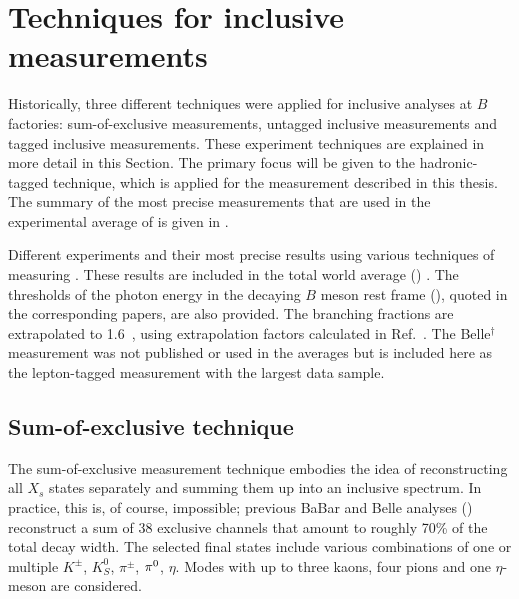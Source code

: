 \section{Techniques for inclusive \safeBtoXsgamma measurements}\label{sec:btosgamma_techniques}
Historically, three different techniques were applied for inclusive \BtoXsgamma analyses at $B$ factories: 
sum-of-exclusive measurements,
untagged inclusive measurements and
tagged inclusive measurements.
These experiment techniques are explained in more detail in this Section.
The primary focus will be given to the hadronic-tagged technique, which is applied for the measurement described in this thesis.
The summary of the most precise measurements that are used in the experimental average of  is given in .

{\renewcommand{\arraystretch}{1.2}
 \begin{table}[!htbp]
     \centering
     \caption{\label{tab:btosgamma_inclusive_summary}
     Different experiments and their most precise results using various techniques of measuring \BtoXsgamma.
     These results are included in the total \BtoXsgamma world average () \cite{Amhis:2022mac,Workman:2022ynf}.
     The thresholds of the photon energy in the decaying $B$ meson rest frame (\EB), quoted in the corresponding papers, are also provided.
     The branching fractions are extrapolated to 1.6~\gev, using extrapolation factors calculated in Ref.~\cite{Buchmuller:2005zv}.
     The Belle$^{\dagger}$ measurement was not published or used in the averages but is included here as the lepton-tagged measurement with the largest data sample.
     }
     
 \end{table}
 }

\subsection{Sum-of-exclusive technique}\label{sec:sum_of_exclusive}

The sum-of-exclusive measurement technique embodies the idea of reconstructing all $X_s$ states separately and summing them up into an inclusive spectrum.
In practice, this is, of course, impossible; previous BaBar and Belle analyses (\cite{BaBar:2012eja,Belle:2014nmp}) reconstruct a sum of 38 exclusive channels that amount to roughly 70\% of the total \BtoXsgamma decay width.
The selected final states include various combinations of one or multiple $K^{\pm}$, $K_S^0$, $\pi^{\pm}$, $\pi^0$, $\eta$.
Modes with up to three kaons, four pions and one $\eta$-meson are considered.


